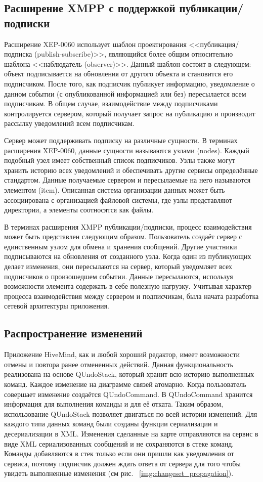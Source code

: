 \subsection{Расширение XMPP с поддержкой публикации/подписки}
Расширение XEP-0060 использует шаблон проектирования <<публикация/подписка
(publish-subscribe)>>, являющийся более общим относительно шаблона <<наблюдатель
(observer)>>. Данный шаблон состоит в следующем: объект подписывается на
обновления от другого объекта и становится его подписчиком. После того, как
подписчик публикует информацию, уведомление о данном событии (с опубликованной
информацией или без) пересылается всем подписчикам. В общем случае,
взаимодействие между подписчиками контролируется сервером, который получает
запрос на публикацию и производит рассылку уведомлений всем подписчикам.

Сервер может поддерживать подписку на различные сущности. В терминах расширения
XEP-0060, данные сущности называются узлами (nodes). Каждый подобный узел имеет
собственный список подписчиков. Узлы также могут хранить историю всех
уведомлений и обеспечивать другие сервисы определённые стандартом. Данные
получаемые сервером и пересылаемые на него называются элементом (item).
Описанная система организации данных может быть ассоциирована с организацией
файловой системы, где узлы представляют директории, а элементы соотносятся как
файлы.

В терминах расширения XMPP публикации/подписки, процесс
взаимодействия может быть представлен следующим образом. Пользователь создаёт сервер с единственным
узлом для обмена и хранения сообщений. Другие участники подписываются на
обновления от созданного узла. Когда один из публикующих делает изменения, они
пересылаются на сервер, который уведомляет всех подписчиков о произошедшем
событии. Данные пересылаются, используя возможности элемента содержать в себе
полезную нагрузку. Учитывая характер процесса взаимодействия между сервером и
подписчикам, была начата разработка сетевой архитектуры приложения.

\subsection{Распространение изменений}
\label{sec:changeset_propagation}
Приложение HiveMind, как и любой хороший редактор, имеет возможности отмены и
повтора ранее отмененных действий. Данная функциональность реализована на основе
QUndoStack, который хранит всю историю выполненных команд. Каждое изменение на
диаграмме связей атомарно. Когда пользователь совершает изменение создаётся
QUndoCommand. В QUndoCommand хранится информация для выполнения команды и для её
отката. Таким образом, использование QUndoStack позволяет двигаться по всей
истории изменений. Для каждого типа данных команд были созданы функции
сериализации и десериализации в XML. Изменения сделанные на карте отправляются
на сервис в виде XML сериализованных сообщений и не сохраняются в стеке команд.
Команды добавляются в стек только если они пришли как уведомления от сервиса,
поэтому подписчик должен ждать ответа от сервера для того чтобы увидеть
выполненные изменения (см рис. ~\ref{img:changeset_propagation}).

